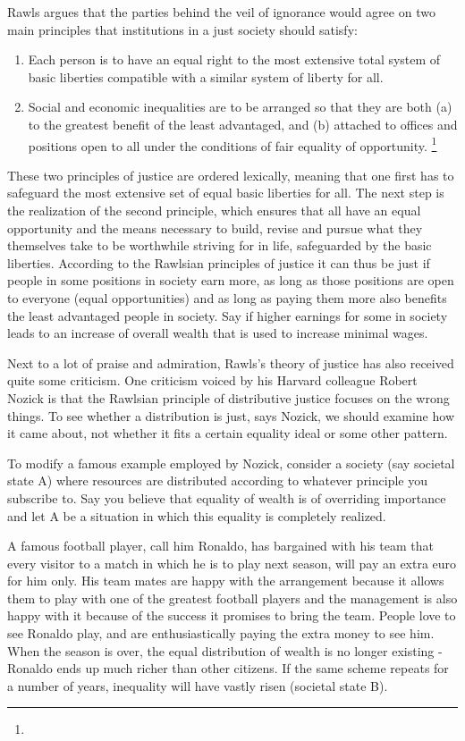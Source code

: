 \documentclass[11pt]{article}
\begin{document}
Rawls argues that the parties behind the veil of ignorance would agree on two main principles that institutions in a just society should satisfy:
\begin{enumerate}

\item Each person is to have an equal right to the most extensive total system of basic liberties compatible with a similar system of liberty for all.

\item Social and economic inequalities are to be arranged so that they are both (a)
to the greatest benefit of the least advantaged, and (b) attached to offices and positions open to all under the conditions of fair equality of opportunity. \footnote{}
\end{enumerate}
These two principles of justice are ordered lexically, meaning that one first has to safeguard the most extensive set of equal basic liberties for all. The next step is the realization of the second principle, which ensures that all have an equal opportunity and the means necessary to build, revise and pursue what they themselves take to be worthwhile striving for in life, safeguarded by the basic liberties. According to the Rawlsian principles of justice it can thus be just if people in some positions in society earn more, as long as those positions are open to everyone (equal opportunities) and as long as paying them more also benefits the least advantaged people in society. Say if higher earnings for some in society leads to an increase of overall wealth that is used to increase minimal wages.


Next to a lot of praise and admiration, Rawls’s theory of justice has also received quite some criticism. One criticism voiced by his Harvard colleague Robert Nozick is that the Rawlsian principle of distributive justice focuses on the wrong things. To see whether a distribution is just, says Nozick, we should examine how it came about, not whether it fits a certain equality ideal or some other pattern.

To modify a famous example employed by Nozick, consider a society (say societal state A) where resources are distributed according to whatever principle you subscribe to. Say you believe that equality of wealth is of overriding importance and let A be a situation in which this equality is completely realized.

A famous football player, call him Ronaldo, has bargained with his team that every visitor to a match in which he is to play next season, will pay an extra euro for him only. His team mates are happy with the arrangement because it allows them to play with one of the greatest football players and the management is also happy with it because of the success it promises to bring the team. People love to see Ronaldo play, and are enthusiastically paying the extra money to see him. When the season is over, the equal distribution of wealth is no longer existing - Ronaldo ends up much richer than other citizens. If the same scheme repeats for a number of years, inequality will have vastly risen (societal state B).
\end{document}
